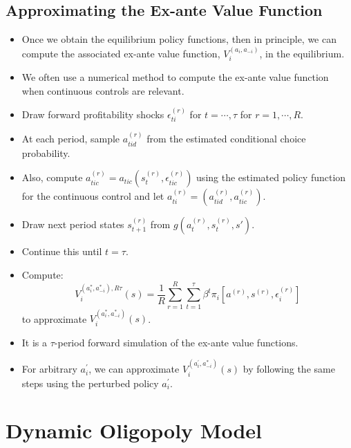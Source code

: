 \documentclass[
]{book}
\providecommand{\tightlist}{%
  \setlength{\itemsep}{0pt}\setlength{\parskip}{0pt}}
\begin{document}
\hypertarget{approximating-the-ex-ante-value-function}{%
\subsection{Approximating the Ex-ante Value Function}\label{approximating-the-ex-ante-value-function}}

\begin{itemize}
\tightlist
\item
  Once we obtain the equilibrium policy functions, then in principle,
  we can compute the associated ex-ante value function,
  \(V_i^{(a_i, a_{-i})}\), in the equilibrium.
\item
  We often use a numerical method to compute the ex-ante value
  function when continuous controls are relevant.
\item
  Draw forward profitability shocks \(\epsilon_{ti}^{(r)}\) for
  \(t = \cdots, \tau\) for \(r = 1, \cdots, R\).
\item
  At each period, sample \(a_{tid}^{(r)}\) from the estimated
  conditional choice probability.
\item
  Also, compute
  \(a_{tic}^{(r)} = a_{tic}(s_t^{(r)}, \epsilon_{tic}^{(r)})\) using the
  estimated policy function for the continuous control and let
  \(a_{ti}^{(r)} = (a_{tid}^{(r)}, a_{tic}^{(r)})\).
\item
  Draw next period states \(s_{t + 1}^{(r)}\) from
  \(g(a_{t}^{(r)}, s_t^{(r)}, s')\).
\item
  Continue this until \(t = \tau\).
\item
  Compute: \begin{equation}
  V_i^{(a_i^*, a_{-i}^*), R\tau}(s) = \frac{1}{R}\sum_{r = 1}^R \sum_{t = 1}^\tau \beta^t \pi_i[a^{(r)}, s^{(r)}, \epsilon_i^{(r)}]
  \end{equation} to approximate \(V_i^{(a_i^*, a_{-i}^*)}(s)\).
\item
  It is a \(\tau\)-period forward simulation of the ex-ante value
  functions.
\item
  For arbitrary \(a_i^{\prime}\), we can approximate
  \(V_i^{(a_i^{\prime}, a_{-i}^*)}(s)\) by following the same steps
  using the perturbed policy \(a_i^{\prime}\).
\end{itemize}

\hypertarget{dynamic-oligopoly-model}{%
\section{Dynamic Oligopoly Model}\label{dynamic-oligopoly-model}}
\end{document}
